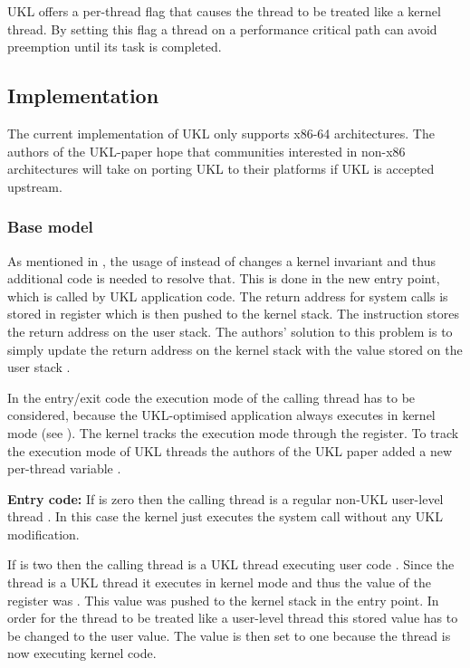 \documentclass[10pt,twocolumn,a4paper]{article}
\begin{document}
    UKL offers a per-thread flag that causes the thread to be treated like a kernel thread.
    By setting this flag a thread on a performance critical path can avoid preemption
    until its task is completed.

  \subsection{Implementation}
    The current implementation of UKL only supports x86-64 architectures.
    The authors of the UKL-paper hope that communities interested in non-x86 architectures
    will take on porting UKL to their platforms if UKL is accepted upstream.

    \subsubsection{Base model}\label{sec:imp:base-model}
      As mentioned in , the usage of  instead of 
      changes a kernel invariant and thus additional code is needed to resolve that.
      This is done in the new  entry point, which is called by
      UKL application code.
      The return address for system calls is stored in  register which is then 
      pushed to the kernel stack.
      The  instruction stores the return address on the user stack.
      The authors' solution to this problem is to simply update the return address on the kernel
      stack with the value stored on the user stack \cite{ukl-github-entry}.

      In the entry/exit code the execution mode of the calling thread has to be considered,
      because the UKL-optimised application always executes in kernel mode (see ).
      The kernel tracks the execution mode through the  register.
      To track the execution mode of UKL threads the authors of the UKL paper added a 
      new per-thread variable  \cite{ukl-github-entry, ukl-github-inuser-add}.

      \textbf{Entry code:}
      If  is zero then the calling thread is a regular non-UKL 
      user-level thread \cite{ukl-github-inuser-getter-setter}.
      In this case the kernel just executes the system call without any UKL modification.

      If  is two then the calling thread is a UKL thread executing 
      user code \cite{ukl-github-inuser-getter-setter}.
      Since the thread is a UKL thread it executes in kernel mode and thus the value of the 
       register was .
      This value was pushed to the kernel stack in the  entry point.
      In order for the thread to be treated like a user-level thread this stored  
      value has to be changed to the user  value.
      The  value is then set to one because the thread is now executing kernel code.
\end{document}
